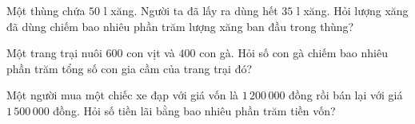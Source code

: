 \begin{ex} %
Một thùng chứa $50\text{ l}$ xăng. Người ta đã lấy ra dùng hết $35\text{ l}$ xăng. Hỏi lượng xăng đã dùng chiếm bao nhiêu phần trăm lượng xăng ban đầu trong thùng?
\end{ex}

\begin{ex} %
Một trang trại nuôi $600$ con vịt và $400$ con gà. Hỏi số con gà chiếm bao nhiêu phần trăm tổng số con gia cầm của trang trại đó?
\end{ex}

\begin{ex} %
Một người mua một chiếc xe đạp với giá vốn là $1\,200\,000$ đồng rồi bán lại với giá $1\,500\,000$ đồng. Hỏi số tiền lãi bằng bao nhiêu phần trăm tiền vốn?
\end{ex}
